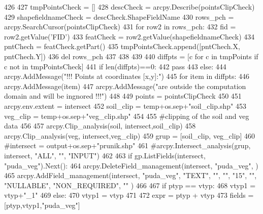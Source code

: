 \begin{DoxyCode}
426 
427       tmpPointsCheck = []
428       descCheck = arcpy.Describe(pointsClipCheck)
429       shapefieldnameCheck = descCheck.ShapeFieldName
430       rows\_pch = arcpy.SearchCursor(pointsClipCheck)
431       \textcolor{keywordflow}{for} row2 \textcolor{keywordflow}{in} rows\_pch:
432         fid = row2.getValue(\textcolor{stringliteral}{'FID'})
433         featCheck = row2.getValue(shapefieldnameCheck)
434         pntChech = featCheck.getPart()
435         tmpPointsCheck.append([pntChech.X, pntChech.Y])
436       del rows\_pch
437 
438 
439 
440       diffpts = [c \textcolor{keywordflow}{for} c \textcolor{keywordflow}{in} tmpPoints \textcolor{keywordflow}{if} c \textcolor{keywordflow}{not} \textcolor{keywordflow}{in} tmpPointsCheck]
441       \textcolor{keywordflow}{if} len(diffpts)==0:
442         \textcolor{keywordflow}{pass}
443       \textcolor{keywordflow}{else}:
444         arcpy.AddMessage(\textcolor{stringliteral}{"!!! Points at coordinates [x,y]:"})
445         \textcolor{keywordflow}{for} item \textcolor{keywordflow}{in} diffpts:
446           arcpy.AddMessage(item)
447         arcpy.AddMessage(\textcolor{stringliteral}{"are outside the computation domain and will be ingnored !!!"})
448 
449       points = pointsClipCheck
450 
451   arcpy.env.extent = intersect
452   soil\_clip = temp+os.sep+\textcolor{stringliteral}{"soil\_clip.shp"}
453   veg\_clip = temp+os.sep+\textcolor{stringliteral}{"veg\_clip.shp"}
454 
455   \textcolor{comment}{#clipping of the soil and veg data
}
456 
457   arcpy.Clip\_analysis(soil, intersect,soil\_clip)
458   arcpy.Clip\_analysis(veg, intersect,veg\_clip)
459   grup = [soil\_clip, veg\_clip]
460   \textcolor{comment}{#intersect = output+os.sep+"prunik.shp"
}
461   \textcolor{comment}{#arcpy.Intersect\_analysis(grup, intersect, "ALL", "", "INPUT")
}
462 
463   \textcolor{keywordflow}{if} gp.ListFields(intersect, \textcolor{stringliteral}{"puda\_veg"}).Next():
464       arcpy.DeleteField\_management(intersect, \textcolor{stringliteral}{"puda\_veg"}, )
465   arcpy.AddField\_management(intersect, \textcolor{stringliteral}{"puda\_veg"}, \textcolor{stringliteral}{"TEXT"}, \textcolor{stringliteral}{""}, \textcolor{stringliteral}{""}, \textcolor{stringliteral}{"15"}, \textcolor{stringliteral}{""}, \textcolor{stringliteral}{"NULLABLE"}, \textcolor{stringliteral}{"NON\_REQUIRED"}, \textcolor{stringliteral}{""}
      )
466 
467   \textcolor{keywordflow}{if} ptyp == vtyp:
468       vtyp1 = vtyp+\textcolor{stringliteral}{"\_1"}
469   \textcolor{keywordflow}{else}:
470       vtyp1 = vtyp
471 
472   expr = ptyp + vtyp
473   fields = [ptyp,vtyp1,\textcolor{stringliteral}{"puda\_veg"}]

\end{DoxyCode}
